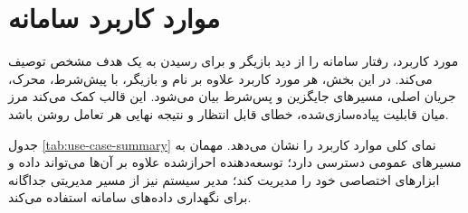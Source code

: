 \section{موارد کاربرد سامانه}
مورد کاربرد، رفتار سامانه را از دید بازیگر و برای رسیدن به یک هدف مشخص توصیف می‌کند. در این بخش، هر مورد کاربرد علاوه بر نام و بازیگر، با پیش‌شرط، محرک، جریان اصلی، مسیرهای جایگزین و پس‌شرط بیان می‌شود. این قالب کمک می‌کند مرز میان قابلیت پیاده‌سازی‌شده، خطای قابل انتظار و نتیجه نهایی هر تعامل روشن باشد.

جدول \ref{tab:use-case-summary} نمای کلی موارد کاربرد را نشان می‌دهد. مهمان به مسیرهای عمومی دسترسی دارد؛ توسعه‌دهنده احرازشده علاوه بر آن‌ها می‌تواند داده و ابزارهای اختصاصی خود را مدیریت کند؛ مدیر سیستم نیز از مسیر مدیریتی جداگانه برای نگهداری داده‌های سامانه استفاده می‌کند.

\begingroup
\setlength{\LTpre}{0.15\baselineskip}
\setlength{\LTpost}{0.15\baselineskip}
\fontsize{11.5}{14}\selectfont
\renewcommand{\arraystretch}{1.05}
